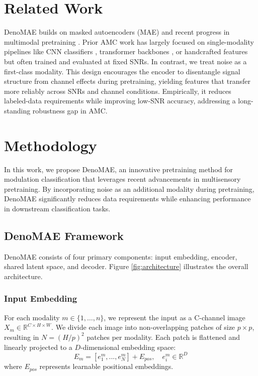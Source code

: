 \section{Related Work}

DenoMAE builds on masked autoencoders (MAE) \cite{he2021mae} and recent progress in multimodal pretraining \cite{bachmann2022multimae}. Prior AMC work has largely focused on single-modality pipelines like CNN classifiers \cite{peng2017modulation}, transformer backbones \cite{kong2023transformer}, or handcrafted features but often trained and evaluated at fixed SNRs. In contrast, we treat noise as a first-class modality. This design encourages the encoder to disentangle signal structure from channel effects during pretraining, yielding features that transfer more reliably across SNRs and channel conditions. Empirically, it reduces labeled-data requirements while improving low-SNR accuracy, addressing a long-standing robustness gap in AMC.


\section{Methodology}
In this work, we propose DenoMAE, an innovative pretraining method for modulation classification that leverages recent advancements in multisensory pretraining. By incorporating noise as an additional modality during pretraining, DenoMAE significantly reduces data requirements while enhancing performance in downstream classification tasks.

\subsection{DenoMAE Framework}

DenoMAE consists of four primary components: input embedding, encoder, shared latent space, and decoder. Figure \ref{fig:architecture} illustrates the overall architecture.

\subsubsection{Input Embedding}

For each modality $m \in \{1, \dots, n\}$, we represent the input as a C-channel image $X_m \in \mathbb{R}^{C \times H \times W}$. We divide each image into non-overlapping patches of size $p \times p$, resulting in $N = (H/p)^2$ patches per modality. Each patch is flattened and linearly projected to a $D$-dimensional embedding space:
$$E_m = [e^m_1, ..., e^m_N] + E_{pos}, \quad e^m_i \in \mathbb{R}^D$$
where $E_{pos}$ represents learnable positional embeddings.

